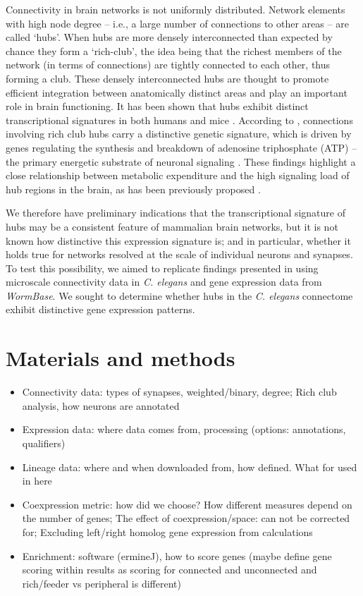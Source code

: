 \documentclass[10pt,letterpaper]{article}
\begin{document}
Connectivity in brain networks is not uniformly distributed. Network elements with high node degree – i.e., a large number of connections to other areas – are called `hubs'.
When hubs are more densely interconnected than expected by chance they form a `rich-club', the idea being that the richest members of the network (in terms of connections) are tightly connected to each other, thus forming a club.
These densely interconnected hubs are thought to promote efficient integration between anatomically distinct areas and play an important role in brain functioning.
It has been shown that hubs exhibit distinct transcriptional signatures in both humans \cite{Vertes2016a} and mice \cite{Fulcher2015}.
According to \citet{Fulcher2015}, connections involving rich club hubs carry a distinctive genetic signature, which is driven by genes regulating the synthesis and breakdown of adenosine triphosphate (ATP) – the primary energetic substrate of neuronal signaling \cite{Fulcher2015}.
These findings highlight a close relationship between metabolic expenditure and the high signaling load of hub regions in the brain, as has been previously proposed \cite{Bullmore2012}.


We therefore have preliminary indications that the transcriptional signature of hubs may be a consistent feature of mammalian brain networks, but it is not known how distinctive this expression signature is; and in particular, whether it holds true for networks resolved at the scale of individual neurons and synapses.
To test this possibility, we aimed to replicate findings presented in \cite{Fulcher2015} using microscale connectivity data in \emph{C. elegans} and gene expression data from \emph{WormBase}.
We sought to determine whether hubs in the \emph{C. elegans} connectome exhibit distinctive gene expression patterns.


\section*{Materials and methods}

\begin{itemize}
    \item{Connectivity data: types of synapses, weighted/binary, degree; Rich club analysis, how neurons are annotated}
    \item{Expression data: where data comes from, processing (options: annotations, qualifiers)}
    \item{Lineage data: where and when downloaded from, how defined. What for used in here}
    \item{Coexpression metric: how did we choose? How different measures depend on the number of genes; The effect of coexpression/space: can not be corrected for; Excluding left/right homolog gene expression from calculations}
    \item{Enrichment: software (ermineJ), how to score genes (maybe define gene scoring within results as scoring for connected and unconnected and rich/feeder vs peripheral is different)}
\end{itemize}
\end{document}
